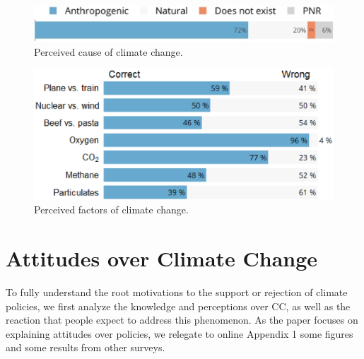 \documentclass[english,5p,authoryear]{elsarticle}
\begin{document}
\begin{figure}[b]
\centering
\includegraphics[width=\columnwidth]{Images_EPS/CC_cause_nolegend2.eps}
\caption{Perceived cause of climate change.}
\label{fig:cause}
\end{figure}

\begin{figure}[t]
\centering
\includegraphics[width=\columnwidth]{Images_EPS/CC_knowledge_valbtr.eps}
\caption{Perceived factors of climate change.}
\label{fig:factors}
\end{figure}

\section{Attitudes over Climate Change\label{sec:attitudes_climate_change}}
    
To fully understand the root motivations to the support or rejection of climate policies, we first analyze the knowledge and perceptions over CC, as well as the reaction that people expect to address this phenomenon. As the paper focuses on explaining attitudes over policies, we relegate to online Appendix 1 some figures and some results from other surveys.
    
\end{document}

